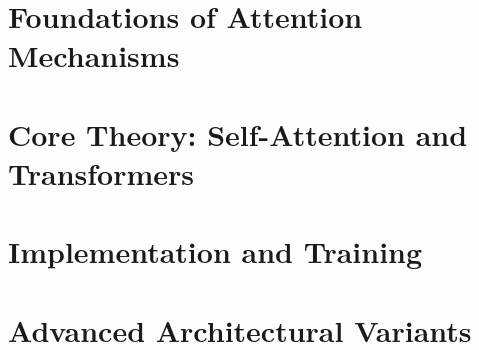 \documentclass[11pt]{article}
\begin{document}
\maketitle
\newpage
\tableofcontents
\newpage

\part{Foundations of Attention Mechanisms}




\part{Core Theory: Self-Attention and Transformers}




\part{Implementation and Training}





\part{Advanced Architectural Variants}




\end{document}
